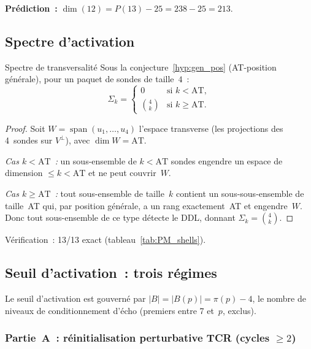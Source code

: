 \documentclass[12pt,a4paper]{article}
\begin{document}
\noindent
\textbf{Prédiction~:} $\dim(12) = P(13) - 25 = 238 - 25 = 213$.


\subsection{Spectre d'activation}
\label{sec:PM_sigma}

\begin{thmbox}{Spectre de transversalité}
\label{thm:sigma}
Sous la conjecture~\ref{hyp:gen_pos} (AT-position générale), pour un
paquet de sondes de taille~$4$~:
\[
  \Sigma_k = \begin{cases}
    0 & \text{si } k < \mathrm{AT}, \\
    \displaystyle\binom{4}{k} & \text{si } k \ge \mathrm{AT}.
  \end{cases}
\]
\end{thmbox}

\begin{proof}
Soit $W = \operatorname{span}(u_1, \ldots, u_4)$ l'espace transverse
(les projections des 4~sondes sur $V^{\perp}$), avec
$\dim W = \mathrm{AT}$.

\emph{Cas $k < \mathrm{AT}$~:} un sous-ensemble de $k < \mathrm{AT}$
sondes engendre un espace de dimension $\le k < \mathrm{AT}$ et ne
peut couvrir~$W$.

\emph{Cas $k \ge \mathrm{AT}$~:} tout sous-ensemble de taille~$k$
contient un sous-sous-ensemble de taille~AT qui, par position
générale, a un rang exactement~AT et engendre~$W$. Donc tout
sous-ensemble de ce type détecte le DDL, donnant
$\Sigma_k = \binom{4}{k}$.
\end{proof}

\noindent
Vérification~: 13/13 exact (tableau~\ref{tab:PM_shells}).


\subsection{Seuil d'activation~: trois régimes}
\label{sec:PM_AT}

Le seuil d'activation est gouverné par
$|B| = |B(p)| = \pi(p) - 4$,
le nombre de niveaux de conditionnement d'écho (premiers entre 7
et~$p$, exclus).

\subsubsection{Partie~A~: réinitialisation perturbative TCR (cycles $\ge 2$)}
\end{document}
